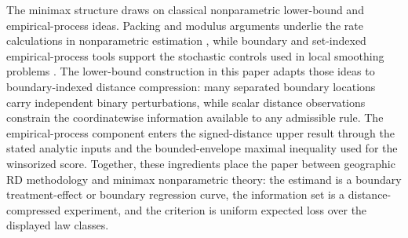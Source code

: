 The minimax structure draws on classical nonparametric lower-bound and empirical-process ideas. Packing and modulus arguments underlie the rate calculations in nonparametric estimation \citep{Stone1982,Tsybakov2009}, while boundary and set-indexed empirical-process tools support the stochastic controls used in local smoothing problems \citep{Mammen1995,Cuevas2004,Vapnik1971,Pollard1984,VanderVaart1996}. The lower-bound construction in this paper adapts those ideas to boundary-indexed distance compression: many separated boundary locations carry independent binary perturbations, while scalar distance observations constrain the coordinatewise information available to any admissible rule. The empirical-process component enters the signed-distance upper result through the stated analytic inputs and the bounded-envelope maximal inequality used for the winsorized score. Together, these ingredients place the paper between geographic RD methodology and minimax nonparametric theory: the estimand is a boundary treatment-effect or boundary regression curve, the information set is a distance-compressed experiment, and the criterion is uniform expected loss over the displayed law classes.
